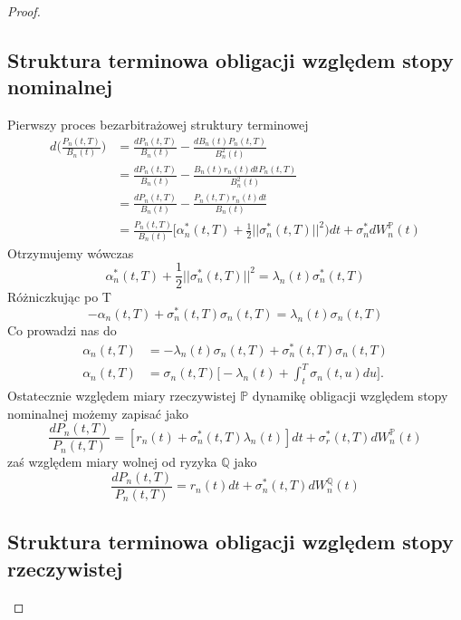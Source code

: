 \documentclass{mini}
\theoremstyle{mythstyle}
\begin{document}
\begin{proof}
	\subsection*{Struktura terminowa obligacji względem stopy nominalnej}
	Pierwszy proces bezarbitrażowej struktury terminowej
	\begin{align*}
	d\bigg(\frac{P_n(t,T)}{B_n(t)}\bigg)  &= \frac{dP_n(t,T)}{B_n(t)} - \frac{dB_n(t)P_n(t,T)}{B_n^2(t)}\\
	&= \frac{dP_n(t,T)}{B_n(t)} - \frac{B_n(t)r_n(t)dt P_n(t,T)}{B_n^2(t)} \\
	&= \frac{dP_n(t,T)}{B_n(t)} - \frac{P_n(t,T) r_n(t)dt }{B_n(t)} \\
	&=\frac{P_n(t,T)}{B_n(t)} \bigg[  \alpha_n^*(t,T) + \frac{1}{2} ||\sigma_n^*(t,T)||^2)dt + \sigma_n^*dW_n^\mathbb{P}(t)
	\end{align*}
	Otrzymujemy wówczas
	\begin{equation}
	\alpha_n^*(t,T) + \frac{1}{2} ||\sigma_n^*(t,T)||^2 = \lambda_n(t)\sigma_n^*(t,T)
	\end{equation}
	Różniczkując po T
	\begin{equation}
	-\alpha_n(t,T) + \sigma_n^*(t,T)\sigma_n(t,T) = \lambda_n(t)\sigma_n(t,T)
	\end{equation}
	Co prowadzi nas do
	\begin{align*}
	\alpha_n(t,T) &= - \lambda_n(t)\sigma_n(t,T) + \sigma_n^*(t,T)\sigma_n(t,T) \\
	\alpha_n(t,T) &= \sigma_n(t,T)\bigg[ -\lambda_n(t) + \int_{t}^{T}\sigma_n(t,u) du\bigg].
	\end{align*}
	Ostatecznie względem miary rzeczywistej $\mathbb{P}$ dynamikę obligacji względem stopy nominalnej możemy zapisać jako
	\begin{equation}
	\frac{dP_n(t,T)}{P_n(t,T)} = [r_n(t) +\sigma^*_n(t,T)\lambda_n(t)]dt + \sigma^*_r(t,T)dW^\mathbb{P}_n(t)
	\end{equation}
	zaś względem miary wolnej od ryzyka $\mathbb{Q}$ jako
	\begin{equation}
	\frac{dP_n(t,T)}{P_n(t,T)} = r_n(t)dt + \sigma^*_n(t,T)dW^\mathbb{Q}_n(t)
	\end{equation}
	
	\subsection*{Struktura terminowa obligacji względem stopy rzeczywistej}
	

\end{proof}
\end{document}

